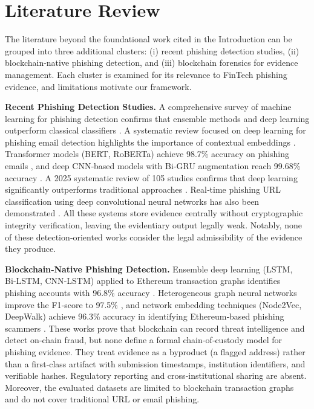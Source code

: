 \documentclass[conference]{IEEEtran}
\begin{document}
\section{Literature Review}

The literature beyond the foundational work cited in the Introduction can be grouped into three additional clusters: (i) recent phishing detection studies, (ii) blockchain-native phishing detection, and (iii) blockchain forensics for evidence management. Each cluster is examined for its relevance to FinTech phishing evidence, and limitations motivate our framework.

\textbf{Recent Phishing Detection Studies.} A comprehensive survey of machine learning for phishing detection confirms that ensemble methods and deep learning outperform classical classifiers \cite{tang2021}. A systematic review focused on deep learning for phishing email detection highlights the importance of contextual embeddings \cite{thakur2023}. Transformer models (BERT, RoBERTa) achieve 98.7\% accuracy on phishing emails \cite{melendez2024}, and deep CNN‑based models with Bi‑GRU augmentation reach 99.68\% accuracy \cite{yakubu2024}. A 2025 systematic review of 105 studies confirms that deep learning significantly outperforms traditional approaches \cite{shukur2025}. Real‑time phishing URL classification using deep convolutional neural networks has also been demonstrated \cite{alzahrani2023}. All these systems store evidence centrally without cryptographic integrity verification, leaving the evidentiary output legally weak. Notably, none of these detection‐oriented works consider the legal admissibility of the evidence they produce.

\textbf{Blockchain‑Native Phishing Detection.} Ensemble deep learning (LSTM, Bi‑LSTM, CNN‑LSTM) applied to Ethereum transaction graphs identifies phishing accounts with 96.8\% accuracy \cite{malla2023}. Heterogeneous graph neural networks improve the F1‑score to 97.5\% \cite{kim2023}, and network embedding techniques (Node2Vec, DeepWalk) achieve 96.3\% accuracy in identifying Ethereum‑based phishing scammers \cite{wu2020}. These works prove that blockchain can record threat intelligence and detect on‑chain fraud, but none define a formal chain‑of‑custody model for phishing evidence. They treat evidence as a byproduct (a flagged address) rather than a first‑class artifact with submission timestamps, institution identifiers, and verifiable hashes. Regulatory reporting and cross‑institutional sharing are absent. Moreover, the evaluated datasets are limited to blockchain transaction graphs and do not cover traditional URL or email phishing.
\end{document}
